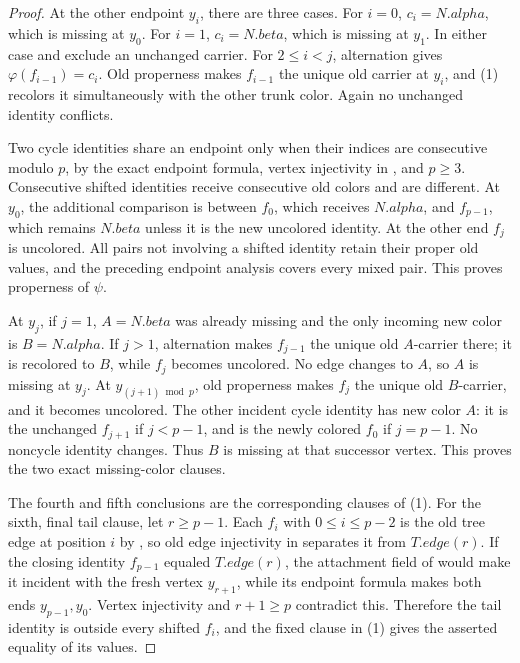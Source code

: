 \begin{proof}
At the other endpoint $y_i$, there are three cases.  For $i=0$,
$c_i=N.alpha$, which is missing at $y_0$.  For $i=1$,
$c_i=N.beta$, which is missing at $y_1$.  In either case
 and  exclude an unchanged
carrier.  For $2\leq i<j$, alternation gives
$\varphi(f_{i-1})=c_i$.  Old properness makes $f_{i-1}$ the unique old
carrier at $y_i$, and (1) recolors it simultaneously with the other trunk
color.  Again no unchanged identity conflicts.

Two cycle identities share an endpoint only when their indices are
consecutive modulo $p$, by the exact endpoint formula, vertex injectivity
in , and $p\geq3$.  Consecutive shifted identities
receive consecutive old colors and are different.  At $y_0$, the
additional comparison is between $f_0$, which receives $N.alpha$, and
$f_{p-1}$, which remains $N.beta$ unless it is the new uncolored identity.
At the other end $f_j$ is uncolored.  All pairs not involving a shifted
identity retain their proper old values, and the preceding endpoint
analysis covers every mixed pair.  This proves properness of $\psi$.

At $y_j$, if $j=1$, $A=N.beta$ was already missing and the only incoming
new color is $B=N.alpha$.  If $j>1$, alternation makes $f_{j-1}$ the
unique old $A$-carrier there; it is recolored to $B$, while $f_j$ becomes
uncolored.  No edge changes to $A$, so $A$ is missing at $y_j$.  At
$y_{(j+1)\bmod p}$, old properness makes $f_j$ the unique old $B$-carrier,
and it becomes uncolored.  The other incident cycle identity has new color
$A$: it is the unchanged $f_{j+1}$ if $j<p-1$, and is the newly colored
$f_0$ if $j=p-1$.  No noncycle identity changes.  Thus $B$ is missing at
that successor vertex.  This proves the two exact missing-color clauses.

The fourth and fifth conclusions are the corresponding clauses of (1).
For the sixth, final tail clause, let $r\geq p-1$.  Each $f_i$ with
$0\leq i\leq p-2$ is the old tree edge at position $i$ by
, so old edge injectivity in
 separates it from $T.edge(r)$.  If the closing identity
$f_{p-1}$ equaled $T.edge(r)$, the attachment field of
 would make it incident with the fresh vertex
$y_{r+1}$, while its endpoint formula makes both ends $y_{p-1},y_0$.
Vertex injectivity and $r+1\geq p$ contradict this.  Therefore the tail
identity is outside every shifted $f_i$, and the fixed clause in (1) gives
the asserted equality of its values.
\end{proof}
